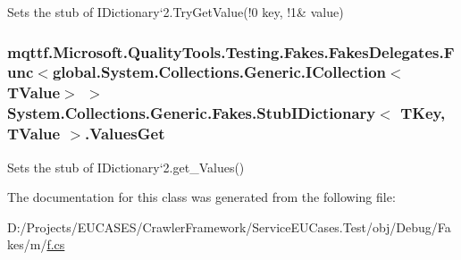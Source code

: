Sets the stub of I\-Dictionary`2.Try\-Get\-Value(!0 key, !1\& value)

\hypertarget{class_system_1_1_collections_1_1_generic_1_1_fakes_1_1_stub_i_dictionary_3_01_t_key_00_01_t_value_01_4_af4495208498b1b85f0bf84d48ed5926d}{
\subsubsection[{Values\-Get}]{\setlength{\rightskip}{0pt plus 5cm}mqttf.\-Microsoft.\-Quality\-Tools.\-Testing.\-Fakes.\-Fakes\-Delegates.\-Func$<$global.\-System.\-Collections.\-Generic.\-I\-Collection$<$T\-Value$>$ $>$ System.\-Collections.\-Generic.\-Fakes.\-Stub\-I\-Dictionary$<$ T\-Key, T\-Value $>$.Values\-Get}}\label{class_system_1_1_collections_1_1_generic_1_1_fakes_1_1_stub_i_dictionary_3_01_t_key_00_01_t_value_01_4_af4495208498b1b85f0bf84d48ed5926d}


Sets the stub of I\-Dictionary`2.get\-\_\-\-Values()



The documentation for this class was generated from the following file\-:\begin{DoxyCompactItemize}
\item 
D\-:/\-Projects/\-E\-U\-C\-A\-S\-E\-S/\-Crawler\-Framework/\-Service\-E\-U\-Cases.\-Test/obj/\-Debug/\-Fakes/m/\hyperlink{m_2f_8cs}{f.\-cs}\end{DoxyCompactItemize}
